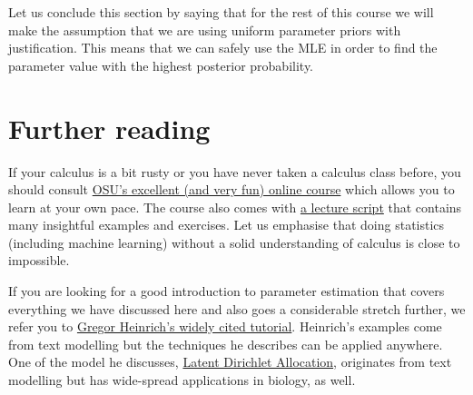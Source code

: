 Let us conclude this section by saying that for the rest of this course we will make the assumption that we are using uniform parameter priors with justification.
This means that we can safely use the MLE in order to find the parameter value with the highest posterior probability.


\section*{Further reading}
If your calculus is a bit rusty or you have never taken a calculus class before, you should consult 
\href{https://www.coursera.org/learn/calculus1}{OSU's excellent (and very fun) online course} which allows you to learn at your own pace. The course also comes with
\href{https://mooculus.osu.edu/handouts}{a lecture script} that contains many insightful examples and exercises. Let us emphasise that doing statistics (including
machine learning) without a solid understanding of calculus is close to impossible.

If you are looking for a good introduction to
parameter estimation that covers everything we have discussed here and also goes a considerable stretch further, we refer you to 
\href{http://www.arbylon.net/publications/text-est.pdf}{Gregor Heinrich's widely cited tutorial}. Heinrich's examples come from text modelling but the techniques he
describes can be applied anywhere. One of the model he discusses, \href{https://en.wikipedia.org/wiki/Latent_Dirichlet_allocation}{Latent Dirichlet Allocation}, originates
from text modelling but has wide-spread applications in biology, as well.


